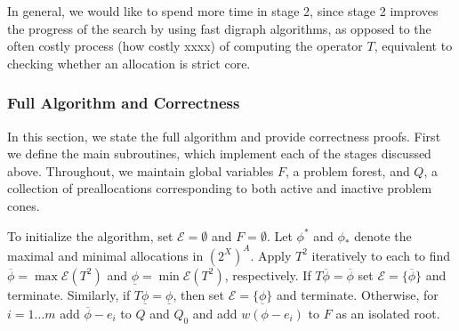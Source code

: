 \documentclass[11pt,reqno]{amsart}
\theoremstyle{definition}
\numberwithin{equation}{section}
\newcommand{\ol}{\overline}
\newcommand{\ul}{\underline}
\newcommand{\pre}{\phi}
\newcommand{\prealloc}{(2^X)^A}
\newcommand{\fix}{\mathcal{E}}
\newcommand{\toppre}{\ol{\pre}}
\newcommand{\acto}{Q_0}
\newcommand{\act}{Q}
\newcommand{\forest}{F}
\newcommand{\fixfind}{\mathcal{E}}
\begin{document}
\begin{enumerate}
In general, we would like to spend more time in stage 2, since stage 2 improves the progress of the search by using fast digraph algorithms, as opposed to the often costly process (how costly xxxx) of computing the operator $T$, equivalent to checking whether an allocation is strict core.  

\subsubsection{Full Algorithm and Correctness} \label{fullalgo}
In this section, we state the full algorithm and provide correctness proofs.
First we define the main subroutines, which implement each of the stages discussed above. 
Throughout, we maintain global variables $\forest$, a problem forest, and $\act$, a collection of preallocations corresponding to both active and inactive problem cones. 

To initialize the algorithm, set $\fixfind = \emptyset$ and $F = \emptyset$. 
Let $\pre^*$ and $\pre_*$ denote the maximal and minimal allocations in $\prealloc$. Apply $T^2$ iteratively to each to find $\toppre = \max \fix(T^2)$ and $\ul{\pre} = \min \fix(T^2)$, respectively.
If $T\toppre = \toppre$ set $\fixfind = \{\toppre\}$ and terminate.
Similarly, if $T\ul{\pre} = \ul{\pre}$, then set $\fixfind = \{\ul{\pre}\}$ and terminate. 
Otherwise, for $i = 1 \hdots m$ add $\toppre - e_i$ to $\act$ and $\acto$ and add $w(\pre - e_i)$ to $F$ as an isolated root. 
 

\end{enumerate}
\end{document}

